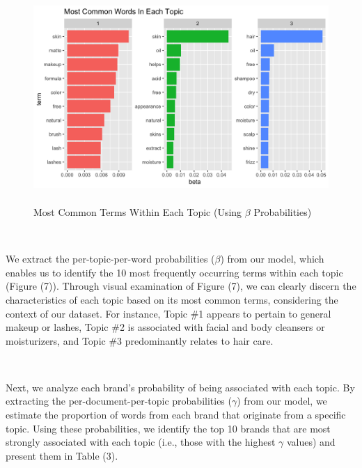 \documentclass[10pt]{article}
\begin{document}
\begin{figure}[ht!]
    \centering
    \hspace*{-4em}
    \includegraphics[height=80mm, width=130mm]{topics.png}
    \caption{Most Common Terms Within Each Topic (Using $\beta$ Probabilities)}
\end{figure}

\

We extract the per-topic-per-word probabilities ($\beta$) from our model, which enables us to identify the 10 most frequently occurring terms within each topic (Figure (7)). Through visual examination of Figure (7), we can clearly discern the characteristics of each topic based on its most common terms, considering the context of our dataset. For instance, Topic \#1 appears to pertain to general makeup or lashes, Topic \#2 is associated with facial and body cleansers or moisturizers, and Topic \#3 predominantly relates to hair care.

\

Next, we analyze each brand's probability of being associated with each topic. By extracting the per-document-per-topic probabilities ($\gamma$) from our model, we estimate the proportion of words from each brand that originate from a specific topic. Using these probabilities, we identify the top 10 brands that are most strongly associated with each topic (i.e., those with the highest $\gamma$ values) and present them in Table (3). 
\end{document}

